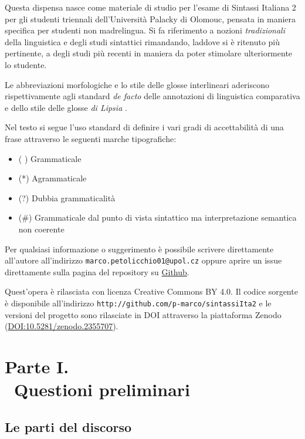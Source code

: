 \documentclass[a4paper,twoside,11pt,chapterprefix=false,bibliography=totocnumbered,listof=flat]{scrbook}
\providecommand{\tightlist}{%
  \setlength{\itemsep}{0pt}\setlength{\parskip}{0pt}}
\begin{document}
\vfill

Questa dispensa nasce come materiale di studio per l'esame di Sintassi Italiana 2 per gli studenti triennali dell'Università Palacky di Olomouc, pensata in maniera specifica per studenti non madrelingua. Si fa riferimento a nozioni \emph{tradizionali} della linguistica e degli studi sintattici rimandando, laddove si è ritenuto più pertinente, a degli studi più recenti in maniera da poter stimolare ulteriormente lo studente.

Le abbreviazioni morfologiche e lo stile delle glosse interlineari aderiscono rispettivamente agli standard \emph{de facto} delle annotazioni di linguistica comparativa \citep[\href{http://www.oxfordhandbooks.com/view/10.1093/oxfordhb/9780199549368.001.0001/oxfordhb-9780199549368}{consultabile online}]{boeckxListOfAbbreviations} e dello stile delle glosse \emph{di Lipsia} \citep{leipzigGlossingRules}.

Nel testo si segue l'uso standard di definire i vari gradi di accettabilità di una frase attraverso le seguenti marche tipografiche:

\begin{itemize}
\tightlist
\item
  ( ) Grammaticale
\item
  (*) Agrammaticale
\item
  (?) Dubbia grammaticalità
\item
  (\#) Grammaticale dal punto di vista sintattico ma interpretazione semantica non coerente
\end{itemize}

Per qualsiasi informazione o suggerimento è possibile scrivere direttamente all'autore all'indirizzo \texttt{marco.petolicchio01@upol.cz} oppure aprire un issue direttamente sulla pagina del repository su \href{http://github.com/p-marco/sintassiIta2}{Github}.

Quest'opera è rilasciata con licenza Creative Commons BY 4.0. Il codice sorgente è disponibile all'indirizzo \texttt{http://github.com/p-marco/sintassiIta2} e le versioni del progetto sono rilasciate in DOI attraverso la piattaforma Zenodo (\url{DOI:10.5281/zenodo.2355707}).

\mainmatter

\part*{Parte I. \\\ Questioni preliminari}

\hypertarget{le-parti-del-discorso}{%
\chapter{Le parti del discorso}\label{le-parti-del-discorso}}
\end{document}
